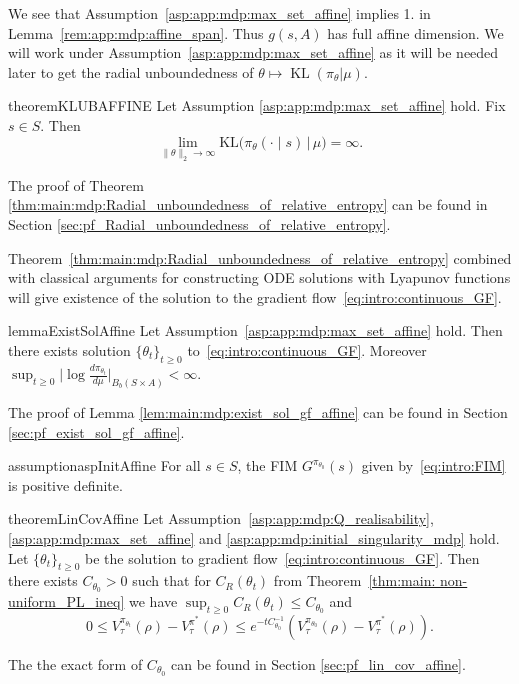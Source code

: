 \documentclass{amsart}
\theoremstyle{definition}
\begin{document}
We see that Assumption~\ref{asp:app:mdp:max_set_affine} implies 1. in 
Lemma~\ref{rem:app:mdp:affine_span}.
Thus $g(s, A)$ has full affine dimension.
We will work under Assumption~\ref{asp:app:mdp:max_set_affine} as it will be needed later to get the radial unboundedness of $\theta \mapsto \operatorname{KL}(\pi_\theta|\mu)$.



\begin{restatable}{theorem}{KLUBAFFINE}\label{thm:main:mdp:Radial_unboundedness_of_relative_entropy}
Let Assumption \ref{asp:app:mdp:max_set_affine} hold.
Fix $s\in S$. 
Then
\[
\lim_{\|\theta\|_2\to\infty}
\mathrm{KL}\bigl(\pi_\theta(\cdot\mid s)\,|\,\mu\bigr)=\infty .
\]
\end{restatable}

The proof of Theorem \ref{thm:main:mdp:Radial_unboundedness_of_relative_entropy} can be found in Section \ref{sec:pf_Radial_unboundedness_of_relative_entropy}.

Theorem~\ref{thm:main:mdp:Radial_unboundedness_of_relative_entropy}
combined with classical arguments for constructing ODE solutions with Lyapunov functions will give existence of the solution to the gradient flow~\eqref{eq:intro:continuous_GF}.

\begin{restatable}{lemma}{ExistSolAffine}\label{lem:main:mdp:exist_sol_gf_affine}
Let Assumption~\ref{asp:app:mdp:max_set_affine} hold.
Then there exists solution $\{\theta_t\}_{t \geq 0}$ to~\eqref{eq:intro:continuous_GF}. 
Moreover $\sup_{t \geq 0} \big|\log \tfrac{d \pi_{\theta_t}}{d\mu}\big|_{B_b(S \times A)} < \infty$.
\end{restatable}

The proof of Lemma \ref{lem:main:mdp:exist_sol_gf_affine} can be found in Section \ref{sec:pf_exist_sol_gf_affine}.

\begin{restatable}{assumption}{aspInitAffine}\label{asp:app:mdp:initial_singularity_mdp}
For all $s \in S$, the FIM $G^{\pi_{\theta_0}}(s)$ given by~\eqref{eq:intro:FIM} is positive definite.
\end{restatable}

\begin{restatable}{theorem}{LinCovAffine}\label{thm:main:lin_cov_affine}
Let Assumption~\ref{asp:app:mdp:Q_realisability}, \ref{asp:app:mdp:max_set_affine} and \ref{asp:app:mdp:initial_singularity_mdp} hold.
Let $\{\theta_t\}_{t \geq 0}$ be the solution to gradient flow~\eqref{eq:intro:continuous_GF}.
Then there exists $C_{\theta_0} > 0$ such that 
for $C_R(\theta_t)$ from Theorem~\ref{thm:main: non-uniform_PL_ineq} we have $\sup_{t \geq 0} C_R(\theta_t) \leq C_{\theta_0}$ and
\[
0 \leq V_\tau^{\pi_{\theta_t}}(\rho) - V_\tau^{\pi^*}(\rho) \leq e^{-t C_{\theta_0}^{-1}} 
(V_\tau^{\pi_{\theta_0}}(\rho) - V_\tau^{\pi^*}(\rho)).
\]
\end{restatable}
The the exact form of $C_{\theta_0}$ can be found in Section \ref{sec:pf_lin_cov_affine}.
\end{document}
